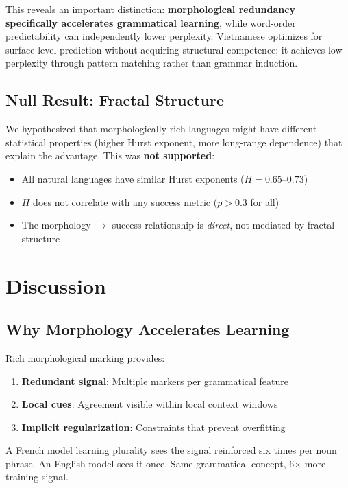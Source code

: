 \documentclass[11pt]{article}
\begin{document}
This reveals an important distinction: \textbf{morphological redundancy specifically accelerates grammatical learning}, while word-order predictability can independently lower perplexity. Vietnamese optimizes for surface-level prediction without acquiring structural competence; it achieves low perplexity through pattern matching rather than grammar induction.

\subsection{Null Result: Fractal Structure}

We hypothesized that morphologically rich languages might have different statistical properties (higher Hurst exponent, more long-range dependence) that explain the advantage. This was \textbf{not supported}:

\begin{itemize}
    \item All natural languages have similar Hurst exponents ($H = 0.65$--$0.73$)
    \item $H$ does not correlate with any success metric ($p > 0.3$ for all)
    \item The morphology $\rightarrow$ success relationship is \textit{direct}, not mediated by fractal structure
\end{itemize}

\section{Discussion}

\subsection{Why Morphology Accelerates Learning}

Rich morphological marking provides:
\begin{enumerate}
    \item \textbf{Redundant signal}: Multiple markers per grammatical feature
    \item \textbf{Local cues}: Agreement visible within local context windows
    \item \textbf{Implicit regularization}: Constraints that prevent overfitting
\end{enumerate}

A French model learning plurality sees the signal reinforced six times per noun phrase. An English model sees it once. Same grammatical concept, 6× more training signal.
\end{document}
